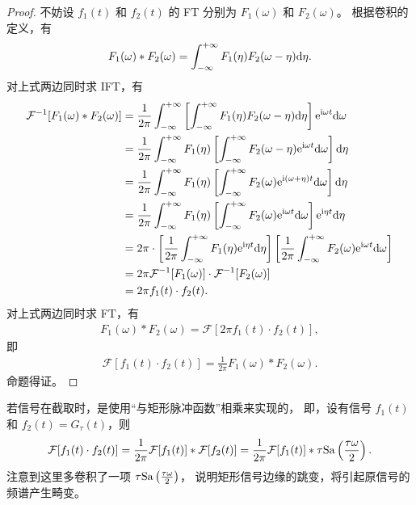 \begin{proof}
    不妨设 $f_1(t)$ 和 $f_2(t)$ 的 FT 分别为 $F_1(\omega)$ 和 $F_2(\omega)$。
    根据卷积的定义，有
    \begin{align*}
        F_1(\omega) * F_2(\omega) = \int_{-\infty}^{+\infty} F_1(\eta)F_2(\omega - \eta)\mathrm{d}\eta.
    \end{align*}
    对上式两边同时求 IFT，有
    \begin{align*}
        \mathcal{F}^{-1}[F_1(\omega) * F_2(\omega)] & = \frac{1}{2\pi}\int_{-\infty}^{+\infty} \left[\int_{-\infty}^{+\infty} F_1(\eta)F_2(\omega - \eta)\mathrm{d}\eta\right]\mathrm{e}^{\mathrm{i}\omega t}\mathrm{d}\omega \\
        & = \frac{1}{2\pi}\int_{-\infty}^{+\infty} F_1(\eta)\left[\int_{-\infty}^{+\infty} F_2(\omega - \eta)\mathrm{e}^{\mathrm{i}\omega t}\mathrm{d}\omega\right]\mathrm{d}\eta \\
        & = \frac{1}{2\pi}\int_{-\infty}^{+\infty} F_1(\eta)\left[\int_{-\infty}^{+\infty} F_2(\omega)\mathrm{e}^{\mathrm{i}(\omega + \eta)t}\mathrm{d}\omega\right]\mathrm{d}\eta \\
        & = \frac{1}{2\pi}\int_{-\infty}^{+\infty} F_1(\eta)\left[\int_{-\infty}^{+\infty} F_2(\omega)\mathrm{e}^{\mathrm{i}\omega t}\mathrm{d}\omega\right]\mathrm{e}^{\mathrm{i}\eta t}\mathrm{d}\eta \\
        & = 2\pi\cdot\left[\frac{1}{2\pi}\int_{-\infty}^{+\infty} F_1(\eta)\mathrm{e}^{\mathrm{i}\eta t}\mathrm{d}\eta\right]\left[\frac{1}{2\pi}\int_{-\infty}^{+\infty} F_2(\omega)\mathrm{e}^{\mathrm{i}\omega t}\mathrm{d}\omega\right] \\
        & = 2\pi \mathcal{F}^{-1}[F_1(\omega)] \cdot \mathcal{F}^{-1}[F_2(\omega)] \\
        & = 2\pi f_1(t) \cdot f_2(t).
    \end{align*}
    对上式两边同时求 FT，有
    \begin{align*}
        F_1(\omega) * F_2(\omega) = \mathcal{F}[2\pi f_1(t) \cdot f_2(t)],
    \end{align*}
    即
    \begin{align*}
        \mathcal{F}[f_1(t) \cdot f_2(t)] = \frac{1}{2\pi}F_1(\omega) * F_2(\omega).
    \end{align*}
    命题得证。
\end{proof}

\begin{example}
    若信号在截取时，是使用“与矩形脉冲函数”相乘来实现的，
    即，设有信号 $f_1(t)$ 和 $f_2(t) = G_{\tau}(t)$，则
    \begin{align*}
        \mathcal{F}[f_1(t) \cdot f_2(t)] = \frac{1}{2\pi}\mathcal{F}[f_1(t)] * \mathcal{F}[f_2(t)] = \frac{1}{2\pi}\mathcal{F}[f_1(t)] * \tau\mathrm{Sa}\left(\frac{\tau\omega}{2}\right).
    \end{align*}
    注意到这里多卷积了一项 $\tau\mathrm{Sa}\left(\frac{\tau\omega}{2}\right)$，
    说明矩形信号边缘的跳变，将引起原信号的频谱产生畸变。
\end{example}

